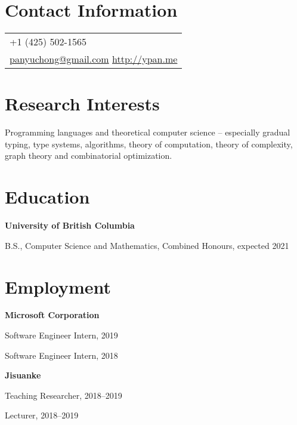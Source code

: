 \documentclass[margin,line]{res}
\newenvironment{list1}{
  \begin{list}{\ding{113}}{%
      \setlength{\itemsep}{0in}
      \setlength{\parsep}{0in} \setlength{\parskip}{0in}
      \setlength{\topsep}{0in} \setlength{\partopsep}{0in}
      \setlength{\leftmargin}{0.17in}}}{\end{list}}
\begin{document}

\begin{resume}

\section{\sc Contact Information}

\vspace{.05in}
\begin{tabular}{p{2in}}
+1 (425) 502-1565 \\
\href{mailto:panyuchong@gmail.com}{panyuchong@gmail.com}
\href{http://ypan.me/}{http://ypan.me}
\end{tabular}


\section{\sc Research Interests}
Programming languages and theoretical computer science -- especially gradual typing, type systems, algorithms, theory of computation, theory of complexity, graph theory and combinatorial optimization.

\section{\sc Education}

{\bf University of British Columbia}\\
\vspace*{-.1in}
\begin{list1}
\item[] B.S., Computer Science and Mathematics, Combined Honours, expected 2021
\end{list1}


\section{\sc Employment}

{\bf Microsoft Corporation}\\
\vspace*{-.1in}
\begin{list1}
\item[] Software Engineer Intern, 2019
\item[] Software Engineer Intern, 2018
\end{list1}

{\bf Jisuanke}\\
\vspace*{-.1in}
\begin{list1}
\item[] Teaching Researcher, 2018--2019
\item[] Lecturer, 2018--2019
\end{list1}


\end{resume}
\end{document}
